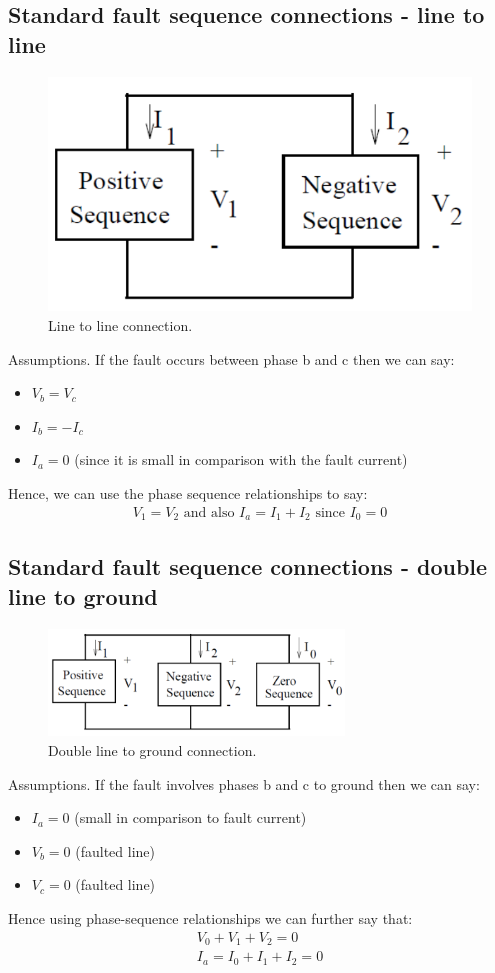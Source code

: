 \documentclass[class=report, crop=false, 12pt,a4paper]{standalone}
\begin{document}
\subsection{Standard fault sequence connections - line to line}
\begin{figure}[H]
	\centering
	\includegraphics[width = 0.4 \textwidth]{../img/figure37.png}
	\caption{Line to line connection.}
\end{figure}
Assumptions. If the fault occurs between phase b and c then we can say:
\begin{itemize}
	\item $V_b = V_c$
	\item $I_b = -I_c$
	\item $I_a = 0$ (since it is small in comparison with the fault current)
\end{itemize}
Hence, we can use the phase sequence relationships to say:
\begin{gather}
	V_1 = V_2 \textrm{ and also } I_a = I_1 + I_2 \textrm{ since } I_0 = 0
\end{gather}
\subsection{Standard fault sequence connections - double line to ground}
\begin{figure}[H]
	\centering
	\includegraphics[width = 0.7\textwidth]{../img/figure38.png}
	\caption{Double line to ground connection.}
\end{figure}
Assumptions. If the fault involves phases b and c to ground then we can say:
\begin{itemize}
	\item $I_a = 0$ (small in comparison to fault current)
	\item $V_b = 0$ (faulted line)
	\item $V_c = 0$ (faulted line)
\end{itemize}
Hence using phase-sequence relationships we can further say that:
\begin{gather}
	V_0 + V_1 + V_2 = 0\\
	I_a = I_0 + I_1 + I_2 = 0
\end{gather}
\end{document}
